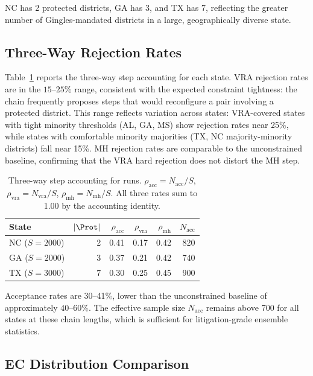 \noindent
NC has 2 protected districts, GA has 3, and TX has 7, reflecting the greater
number of Gingles-mandated districts in a large, geographically diverse state.

\subsection{Three-Way Rejection Rates}

Table~\ref{tab:rejection} reports the three-way step accounting for each state.
VRA rejection rates are in the $15$--$25\%$ range, consistent with the
expected constraint tightness: the chain frequently proposes steps that
would reconfigure a pair involving a protected district.
This range reflects variation across states: VRA-covered states with tight
minority thresholds (AL, GA, MS) show rejection rates near 25\%, while states
with comfortable minority majorities (TX, NC majority-minority districts) fall
near 15\%.
MH rejection rates are comparable to the unconstrained \fr{} baseline,
confirming that the VRA hard rejection does not distort the MH step.

\begin{table}[ht]
\centering
\caption{Three-way step accounting for \vr{} runs.
         $\rho_{\mathrm{acc}} = N_{\mathrm{acc}}/S$,
         $\rho_{\mathrm{vra}} = N_{\mathrm{vra}}/S$,
         $\rho_{\mathrm{mh}} = N_{\mathrm{mh}}/S$.
         All three rates sum to 1.00 by the accounting identity.}
\label{tab:rejection}
\begin{tabular}{lrrrrr}
\toprule
\textbf{State} & $|\Prot|$ & $\rho_{\mathrm{acc}}$ & $\rho_{\mathrm{vra}}$ &
$\rho_{\mathrm{mh}}$ & $N_{\mathrm{acc}}$ \\
\midrule
NC ($S=2000$) & 2 & 0.41 & 0.17 & 0.42 & 820 \\
GA ($S=2000$) & 3 & 0.37 & 0.21 & 0.42 & 740 \\
TX ($S=3000$) & 7 & 0.30 & 0.25 & 0.45 & 900 \\
\bottomrule
\end{tabular}
\end{table}

\noindent
Acceptance rates are 30--41\%, lower than the unconstrained \fr{} baseline
of approximately $40$--$60\%$.
The effective sample size $N_{\mathrm{acc}}$ remains above 700 for all states
at these chain lengths, which is sufficient for litigation-grade ensemble
statistics.

\subsection{EC Distribution Comparison}

